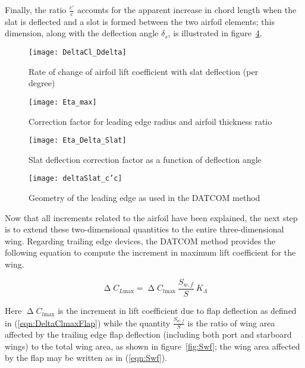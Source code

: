 Finally, the ratio $\frac{c'}{c}$ accounts for the apparent increase in chord length when the slat is deflected and a slot is formed between the two airfoil elements; this dimension, along with the deflection angle $\delta_s$, is illustrated in figure~\ref{fig:c'c_deltaSlat}.

\begin{figure}[H]
  \centering
  \texttt{[image: DeltaCl\_Ddelta]}
  \caption{Rate of change of airfoil lift coefficient with slat deflection (per degree)}
  \label{fig:dCldDelta}
\end{figure}

\begin{figure}[H]
  \centering
  \texttt{[image: Eta\_max]}
  \caption{Correction factor for leading edge radius and airfoil thickness ratio}
  \label{fig:etaDeltaMaxSlat}
\end{figure}

\begin{figure}[H]
  \centering
  \texttt{[image: Eta\_Delta\_Slat]}
  \caption{Slat deflection correction factor as a function of deflection angle}
  \label{fig:etaDeltaSlat}
\end{figure}

\begin{figure}[H]
  \centering
  \texttt{[image: deltaSlat\_c'c]}
  \caption{Geometry of the leading edge as used in the DATCOM method}
  \label{fig:c'c_deltaSlat}
\end{figure}

\noindent
Now that all increments related to the airfoil have been explained, the next step is to extend these two-dimensional quantities to the entire three-dimensional wing.
Regarding trailing edge devices, the DATCOM method provides the following equation to compute the increment in maximum lift coefficient for the wing.

\begin{equation}
\upDelta C_{L\text{max}}=\upDelta C_{l\text{max}}\ \dfrac{S_{w,f}}{S}\ K_\Lambda
\label{eqn:DeltaCLmaxFlap}
\end{equation}

\noindent
Here $\upDelta C_{l\text{max}}$ is the increment in lift coefficient due to flap deflection as defined in (\ref{eqn:DeltaClmaxFlap}) while the quantity $\frac{S_{w,f}}{S}$ is the ratio of wing area affected by the trailing edge flap deflection (including both port and starboard wings) to the total wing area, as shown in figure~\ref{fig:Swf}; the wing area affected by the flap may be written as in (\ref{eqn:Swf}).

